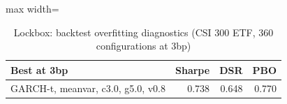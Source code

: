 \begin{table}[!htbp]\centering\small
\caption{Lockbox: backtest overfitting diagnostics (CSI 300 ETF, 360 configurations at 3bp)}\label{tab:overfit_lockbox}
\begin{adjustbox}{max width=\textwidth}
\begin{tabular}{p{6cm}rrr}
\toprule
Best at 3bp & Sharpe & DSR & PBO\\
\midrule
GARCH-t, meanvar, c3.0, g5.0, v0.8 & 0.738 & 0.648 & 0.770\\
\bottomrule
\end{tabular}
\end{adjustbox}
\end{table}
